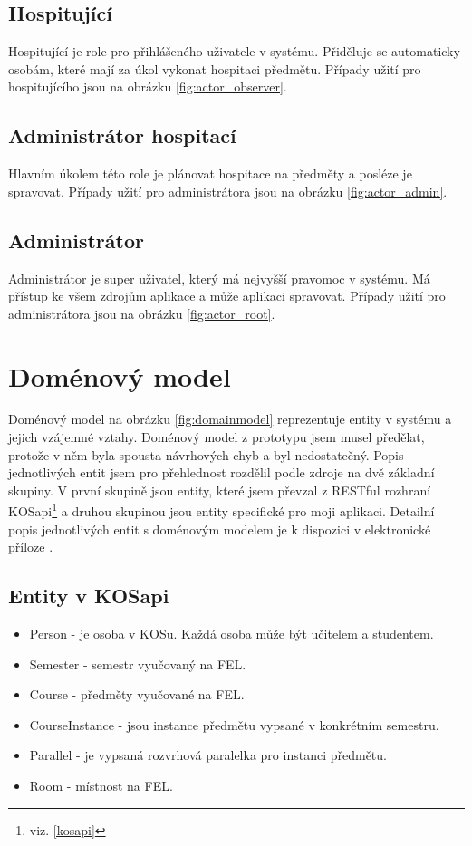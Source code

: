 \subsection{Hospitující}
Hospitující je role pro přihlášeného uživatele v systému. Přiděluje se automaticky osobám, které mají za úkol vykonat hospitaci předmětu. Případy užití pro hospitujícího jsou na obrázku \ref{fig:actor_observer}.

\subsection{Administrátor hospitací}
Hlavním úkolem této role je plánovat hospitace na předměty a posléze je spravovat. Případy užití pro administrátora jsou na obrázku \ref{fig:actor_admin}.

\subsection{Administrátor}
Administrátor je super uživatel, který má nejvyšší pravomoc v systému. Má přístup ke všem zdrojům aplikace a může aplikaci spravovat. Případy užití pro administrátora jsou na obrázku \ref{fig:actor_root}.

\newpage 
\section{Doménový model}
Doménový model na obrázku \ref{fig:domainmodel} reprezentuje entity v systému a jejich vzájemné vztahy. Doménový model z prototypu \citep{prototyp_documentace} jsem musel předělat, protože v něm byla spousta návrhových chyb a byl nedostatečný. Popis jednotlivých entit jsem pro přehlednost rozdělil podle zdroje na dvě základní skupiny. V první skupině jsou entity, které jsem převzal z RESTful rozhraní KOSapi\footnote{viz. \ref{kosapi}} a druhou skupinou jsou entity specifické pro moji aplikaci. Detailní popis jednotlivých entit s doménovým modelem je k dispozici v elektronické příloze \cite{ea}.

\label{sec:domeny_kosapi} 
\subsection{Entity v KOSapi}
\begin{itemize}
\item Person - je osoba v KOSu. Každá osoba může být učitelem a studentem.
\item Semester - semestr vyučovaný na FEL. 
\item Course - předměty vyučované na FEL.
\item CourseInstance - jsou instance předmětu vypsané v konkrétním semestru.
\item Parallel - je vypsaná rozvrhová paralelka pro instanci předmětu.
\item Room - místnost na FEL.
\end{itemize}

